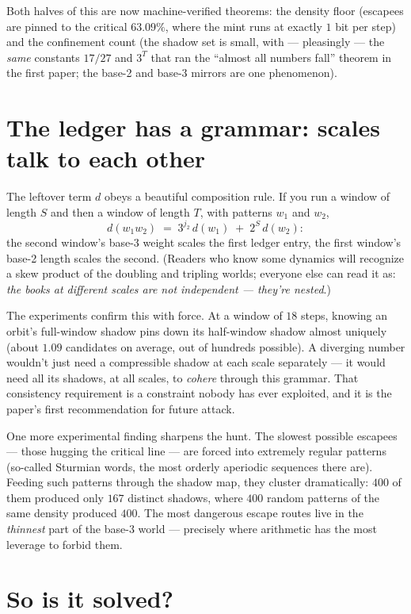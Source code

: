 \documentclass[11pt]{article}
\begin{document}
Both halves of this are now machine-verified theorems: the density
floor (escapees are pinned to the critical $63.09\%$, where the mint
runs at exactly $1$ bit per step) and the confinement count (the
shadow set is small, with --- pleasingly --- the \emph{same} constants
$17/27$ and $3^T$ that ran the ``almost all numbers fall'' theorem in
the first paper; the base-2 and base-3 mirrors are one phenomenon).

\section{The ledger has a grammar: scales talk to each other}

The leftover term $d$ obeys a beautiful composition rule. If you run
a window of length $S$ and then a window of length $T$, with patterns
$w_1$ and $w_2$,
\[
d(w_1 w_2) \;=\; 3^{j_2}\, d(w_1) \;+\; 2^{S}\, d(w_2):
\]
the second window's base-3 weight scales the first ledger entry, the
first window's base-2 length scales the second. (Readers who know some
dynamics will recognize a skew product of the doubling and tripling
worlds; everyone else can read it as: \emph{the books at different
scales are not independent --- they're nested}.)

The experiments confirm this with force. At a window of $18$ steps,
knowing an orbit's full-window shadow pins down its half-window shadow
almost uniquely (about $1.09$ candidates on average, out of hundreds
possible). A diverging number wouldn't just need a compressible shadow
at each scale separately --- it would need all its shadows, at all
scales, to \emph{cohere} through this grammar. That consistency
requirement is a constraint nobody has ever exploited, and it is the
paper's first recommendation for future attack.

One more experimental finding sharpens the hunt. The slowest possible
escapees --- those hugging the critical line --- are forced into
extremely regular patterns (so-called Sturmian words, the most orderly
aperiodic sequences there are). Feeding such patterns through the
shadow map, they cluster dramatically: $400$ of them produced only
$167$ distinct shadows, where $400$ random patterns of the same
density produced $400$. The most dangerous escape routes live in the
\emph{thinnest} part of the base-3 world --- precisely where
arithmetic has the most leverage to forbid them.

\section{So is it solved?}
\end{document}
